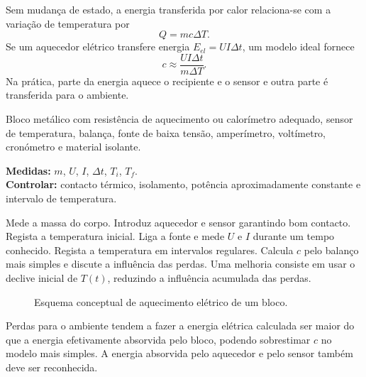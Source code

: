 \documentclass[11pt,a4paper,openany]{book}
\begin{document}
\begin{fundamento}
Sem mudança de estado, a energia transferida por calor relaciona-se com a variação de temperatura por
\[
Q=mc\Delta T.
\]
Se um aquecedor elétrico transfere energia $E_{el}=UI\Delta t$, um modelo ideal fornece
\[
c\approx\frac{UI\Delta t}{m\Delta T}.
\]
Na prática, parte da energia aquece o recipiente e o sensor e outra parte é transferida para o ambiente.
\end{fundamento}

\begin{material}
Bloco metálico com resistência de aquecimento ou calorímetro adequado, sensor de temperatura, balança, fonte de baixa tensão, amperímetro, voltímetro, cronómetro e material isolante.
\end{material}

\begin{variaveis}
\textbf{Medidas:} $m$, $U$, $I$, $\Delta t$, $T_i$, $T_f$.\\
\textbf{Controlar:} contacto térmico, isolamento, potência aproximadamente constante e intervalo de temperatura.
\end{variaveis}

\begin{metodo}
Mede a massa do corpo. Introduz aquecedor e sensor garantindo bom contacto. Regista a temperatura inicial. Liga a fonte e mede $U$ e $I$ durante um tempo conhecido. Regista a temperatura em intervalos regulares. Calcula $c$ pelo balanço mais simples e discute a influência das perdas. Uma melhoria consiste em usar o declive inicial de $T(t)$, reduzindo a influência acumulada das perdas.
\end{metodo}

\begin{figure}[H]
\centering
{}
\caption{Esquema conceptual de aquecimento elétrico de um bloco.}
\end{figure}

\begin{erros}
Perdas para o ambiente tendem a fazer a energia elétrica calculada ser maior do que a energia efetivamente absorvida pelo bloco, podendo sobrestimar $c$ no modelo mais simples. A energia absorvida pelo aquecedor e pelo sensor também deve ser reconhecida.
\end{erros}
\end{document}
